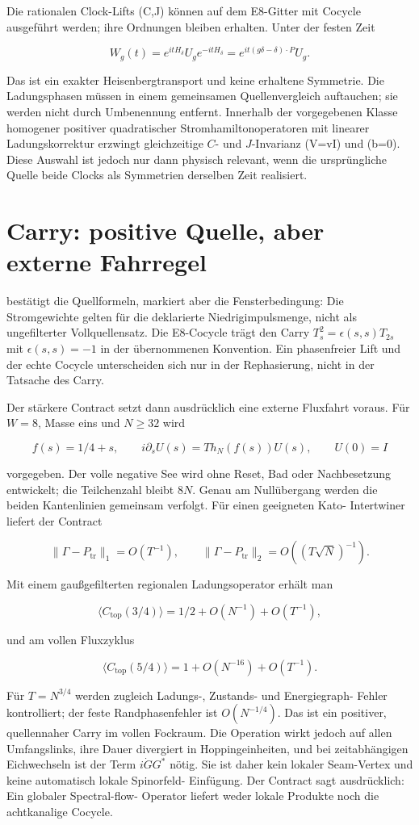 Die rationalen Clock-Lifts (C,J) können auf dem E8-Gitter mit Cocycle
ausgeführt werden; ihre Ordnungen bleiben erhalten. Unter der festen Zeit

\[
 W_g(t)=e^{itH_\delta}U_g e^{-itH_\delta}
 =e^{it(g\delta-\delta)\cdot P}U_g.
\]

Das ist ein exakter Heisenbergtransport und keine erhaltene Symmetrie. Die
Ladungsphasen müssen in einem gemeinsamen Quellenvergleich auftauchen; sie
werden nicht durch Umbenennung entfernt. Innerhalb der vorgegebenen Klasse
homogener positiver quadratischer Stromhamiltonoperatoren mit linearer
Ladungskorrektur erzwingt gleichzeitige \(C\)- und \(J\)-Invarianz
(V=vI) und (b=0). Diese Auswahl ist jedoch nur dann physisch relevant,
wenn die ursprüngliche Quelle beide Clocks als Symmetrien derselben Zeit
realisiert.

\section{Carry: positive Quelle, aber externe Fahrregel}

 bestätigt die Quellformeln, markiert aber die
Fensterbedingung: Die Stromgewichte gelten für die deklarierte
Niedrigimpulsmenge, nicht als ungefilterter Vollquellensatz. Die E8-Cocycle
trägt den Carry \(T_s^2=\epsilon(s,s)T_{2s}\) mit
\(\epsilon(s,s)=-1\) in der übernommenen Konvention. Ein phasenfreier Lift
und der echte Cocycle unterscheiden sich nur in der Rephasierung, nicht in
der Tatsache des Carry.

Der stärkere Contract  setzt dann ausdrücklich
eine externe Fluxfahrt voraus. Für $W=8$, Masse eins und \(N\ge32\) wird

\[
 f(s)=1/4+s,\qquad i\partial_sU(s)=T h_N(f(s))U(s),\qquad U(0)=I
\]

vorgegeben. Der volle negative See wird ohne Reset, Bad oder Nachbesetzung
entwickelt; die Teilchenzahl bleibt \(8N\). Genau am Nullübergang werden die
beiden Kantenlinien gemeinsam verfolgt. Für einen geeigneten Kato-
Intertwiner liefert der Contract

\[
 \|\Gamma-P_\mathrm{tr}\|_1=O(T^{-1}),\qquad
 \|\Gamma-P_\mathrm{tr}\|_2=O((T\sqrt N)^{-1}).
\]

Mit einem gaußgefilterten regionalen Ladungsoperator erhält man

\[
 \langle C_\mathrm{top}(3/4)\rangle
 =1/2+O(N^{-1})+O(T^{-1}),
\]

und am vollen Fluxzyklus

\[
 \langle C_\mathrm{top}(5/4)\rangle
 =1+O(N^{-16})+O(T^{-1}).
\]

Für \(T=N^{3/4}\) werden zugleich Ladungs-, Zustands- und Energiegraph-
Fehler kontrolliert; der feste Randphasenfehler ist $O(N^{-1/4})$. Das ist
ein positiver, quellennaher Carry im vollen Fockraum. Die Operation wirkt
jedoch auf allen Umfangslinks, ihre Dauer divergiert in Hoppingeinheiten,
und bei zeitabhängigen Eichwechseln ist der Term \(i\dot G G^*\) nötig. Sie
ist daher kein lokaler Seam-Vertex und keine automatisch lokale Spinorfeld-
Einfügung. Der Contract sagt ausdrücklich: Ein globaler Spectral-flow-
Operator liefert weder lokale Produkte noch die achtkanalige Cocycle.



